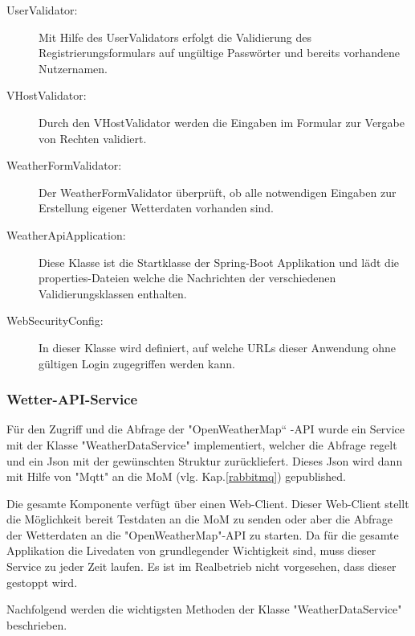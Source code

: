 \begin{description}
\item[UserValidator:]Mit Hilfe des UserValidators erfolgt die Validierung des Registrierungsformulars auf ungültige Passwörter und bereits vorhandene Nutzernamen.
\item[VHostValidator:]Durch den VHostValidator werden die Eingaben im Formular zur Vergabe von Rechten validiert. 
\item[WeatherFormValidator:]Der WeatherFormValidator überprüft, ob alle notwendigen Eingaben zur Erstellung eigener Wetterdaten vorhanden sind.
\item[WeatherApiApplication:]Diese Klasse ist die Startklasse der Spring-Boot Applikation und lädt die properties-Dateien welche die Nachrichten der verschiedenen Validierungsklassen enthalten.
\item[WebSecurityConfig:]In dieser Klasse wird definiert, auf welche URLs dieser Anwendung ohne gültigen Login zugegriffen werden kann.

\end{description}

\subsubsection{Wetter-API-Service}

Für den Zugriff und die Abfrage der "OpenWeatherMap“ -API wurde ein Service mit der Klasse "WeatherDataService" implementiert, welcher die Abfrage regelt und ein Json mit der gewünschten Struktur zurückliefert. Dieses Json wird dann mit Hilfe von "Mqtt" an die MoM (vlg. Kap.\ref{rabbitmq}) gepublished. 

Die gesamte Komponente verfügt über einen Web-Client. Dieser Web-Client stellt die Möglichkeit bereit Testdaten an die MoM zu senden oder aber die Abfrage der Wetterdaten an die "OpenWeatherMap"-API zu starten. Da für die gesamte Applikation die Livedaten von grundlegender Wichtigkeit sind, muss dieser Service zu jeder Zeit laufen. Es ist im Realbetrieb nicht vorgesehen, dass dieser gestoppt wird.

Nachfolgend werden die wichtigsten Methoden der Klasse "WeatherDataService" beschrieben. 

